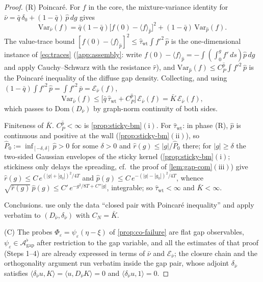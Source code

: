 \documentclass[reqno,final,11pt]{amsart}
\theoremstyle{plain}
\theoremstyle{definition}
\theoremstyle{remark}
\newcommand{\Dom}{\mathrm{Dom}}
\newcommand{\cA}{\mathcal A}
\newcommand{\cE}{\mathcal E}
\begin{document}
\begin{proof}
\textnormal{(R)} Poincar\'e. For $f$ in the core, the mixture-variance
identity for $\bar\nu=\bar q\,\delta_0+(1-\bar q)\,\hat p\,dg$ gives
\[
  \mathrm{Var}_{\bar\nu}(f)
  =\bar q(1-\bar q)\bigl[f(0)-\langle f\rangle_{\hat p}\bigr]^2
   +(1-\bar q)\,\mathrm{Var}_{\hat p}(f).
\]
The value-trace bound
$[f(0)-\langle f\rangle_{\hat p}]^2\le\hat\tau_{\mathrm{wt}}\int f'^2\,\hat p$
is the one-dimensional instance of \eqref{eq:traces} (\cref{app:assembly}: write
$f(0)-\langle f\rangle_{\hat p}=-\int(\int_0^g f'\,ds)\hat p\,dg$ and apply
Cauchy--Schwarz with the resistance $\hat r$), and
$\mathrm{Var}_{\hat p}(f)\le C^{\hat p}_P\int f'^2\,\hat p$ is the Poincar\'e
inequality of the diffuse gap density. Collecting, and using
$(1-\bar q)\int f'^2\,\hat p=\int f'^2\,\bar p=\cE_{\bar\nu}(f)$,
\[
  \mathrm{Var}_{\bar\nu}(f)\le
  \bigl[\bar q\,\hat\tau_{\mathrm{wt}}+C^{\hat p}_P\bigr]\,\cE_{\bar\nu}(f)
  =\bar K\,\cE_{\bar\nu}(f),
\]
which passes to $\Dom(D_{\bar\nu})$ by graph-norm continuity of both sides.

Finiteness of $\bar K$. $C^{\hat p}_P<\infty$ is
\cref{prop:sticky-bm}$(\mathrm i)$. For $\hat\tau_{\mathrm{wt}}$: in phase (R),
$\hat p$ is continuous and positive at the wall
(\cref{prop:sticky-bm}$(\mathrm{ii})$), so
$\hat P_0:=\inf_{[-\delta,\delta]}\hat p>0$ for some $\delta>0$ and
$\hat r(g)\le|g|/\hat P_0$ there; for $|g|\ge\delta$ the two-sided Gaussian
envelopes of the sticky kernel (\cref{prop:sticky-bm}$(\mathrm i)$; stickiness
only delays the spreading, cf.\ the proof of \cref{lem:gap-com}$(\mathrm{iii})$)
give $\hat r(g)\le C\,e^{(|g|+|g_0|)^2/4T}$ and
$\hat p(g)\le C\,e^{-(|g|-|g_0|)^2/4T}$, whence
$\sqrt{\hat r(g)}\,\hat p(g)\le C'\,e^{-g^2/8T+C''|g|}$, integrable; so
$\hat\tau_{\mathrm{wt}}<\infty$ and $\bar K<\infty$.

Conclusions.  use
only the data ``closed pair with Poincar\'e inequality'' and apply verbatim to
$(D_{\bar\nu},\delta_{\bar\nu})$ with $C_N=\bar K$.

\textnormal{(C)} The probes $\Phi_\varepsilon=\psi_\varepsilon(\eta-\xi)$ of
\cref{prop:co-failure} are flat gap observables,
$\psi_\varepsilon\in\cA^{\flat}_{\mathrm{gap}}$ after restriction to the gap
variable, and all the estimates of that proof (Steps 1--4) are already expressed
in terms of $\bar\nu$ and $\cE_{\bar\nu}$; the closure chain and the
orthogonality argument run verbatim inside the gap pair, whose adjoint
$\delta_{\bar\nu}$ satisfies
$\langle\delta_{\bar\nu}u,K\rangle=\langle u,D_{\bar\nu}K\rangle=0$ and
$\langle\delta_{\bar\nu}u,1\rangle=0$.
\end{proof}
\end{document}
